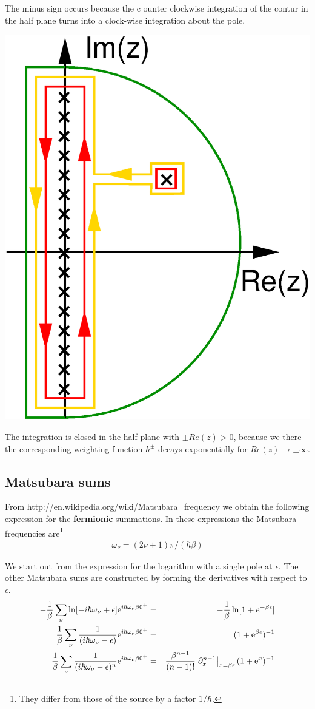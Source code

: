 \documentclass[11pt,a4paper]{report}
\begin{document}
The minus sign occurs because the c ounter clockwise integration of
the contur in the half plane turns into a clock-wise integration about
the pole.

\begin{center}
\includegraphics[width=0.25\linewidth]{Figs/Xfig/Matsubaracontour/contour.eps}
\end{center}

The integration is closed in the half plane with $\pm Re(z)>0$, because
we there the corresponding weighting function $h^{\pm}$ decays
exponentially for $Re(z)\rightarrow\pm\infty$.


\subsection{Matsubara sums}
From \url{http://en.wikipedia.org/wiki/Matsubara_frequency} we obtain
the following expression for the \textbf{fermionic} summations.  In
these expressions the Matsubara frequencies are\footnote{They differ
  from those of the source by a factor $1/\hbar$.}
\begin{eqnarray}
\omega_\nu=(2\nu+1)\pi/(\hbar\beta)
\end{eqnarray}

We start out from the expression for the logarithm with a single pole
at $\epsilon$. The other Matsubara sums are constructed by forming the
derivatives with respect to $\epsilon$.
\begin{eqnarray}
-\frac{1}{\beta}\sum_\nu\ln[-i\hbar\omega_\nu+\epsilon]\mathrm{e}^{i\hbar\omega_\nu\beta0^+}
&=&-\frac{1}{\beta}\ln[1+e^{-\beta \epsilon}]
\\
\frac{1}{\beta}\sum_\nu \frac{1}{(i\hbar\omega_\nu-\epsilon)}\mathrm{e}^{i\hbar\omega_\nu\beta0^+}
&=&(1+\mathrm{e}^{\beta \epsilon})^{-1}
\\
\frac{1}{\beta}\sum_\nu \frac{1}{(i\hbar\omega_\nu-\epsilon)^n}\mathrm{e}^{i\hbar\omega_\nu\beta0^+}
&=&\frac{\beta^{n-1}}{(n-1)!}
\left.\partial_x^{n-1}\right|_{x=\beta\epsilon}(1+\mathrm{e}^{x})^{-1}
\label{eq:matgsubarasinglepole}
\end{eqnarray}
\end{document}
